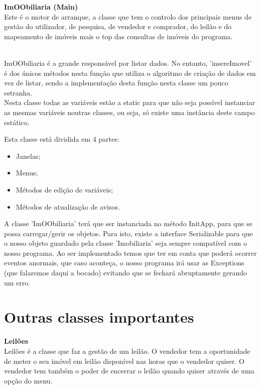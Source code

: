 \documentclass[12pt]{article}
\begin{document}
\pagebreak
\textbf{ImOObiliaria (Main)}
\newline
~\\

Este é o motor de arranque, a classe que tem o controlo dos principais menus de gestão do utilizador, de pesquisa, de vendedor e comprador, do leilão e do mapeamento de imóveis mais o top das consultas de imóveis do programa.

~\\

ImOObiliaria é a grande responsável por listar dados. No entanto, 'insereImovel' é dos únicos métodos nesta função que utiliza o algoritmo de criação de dados em vez de listar, sendo a implementação desta função nesta classe um pouco estranha.
~\\

Nesta classe todas as variáveis estão a static para que não seja possível instanciar as mesmas
variáveis noutras classes, ou seja, só existe uma instância deste campo estático.

Esta classe está dividida em 4 partes:
\newline
\begin{itemize}
\item Janelas;
\item Menus;
\item Métodos de edição de variáveis;
\item Métodos de atualização de avisos.
\end{itemize}

A classe 'ImOObiliaria' terá que ser instanciada no método
InitApp, para que se possa carregar/gerir os objetos.
Para isto, existe a interface Serializable para que o nosso objeto guardado pela classe 'Imobiliaria'
seja sempre compatível com o nosso programa. Ao ser implementado temos que ter em conta
que poderá ocorrer eventos anormais, que caso aconteça, o nosso programa irá usar as Exceptions (que falaremos daqui a bocado)
evitando que se fechará abruptamente gerando um erro. 
~\\

\pagebreak
\section{Outras classes importantes}

\textbf{Leilões}
\newline
~\\

Leilões é a classe que faz a gestão de um leilão. O vendedor tem a oportunidade de meter o seu imóvel em leilão disponível nas horas que o vendedor quiser. O vendedor tem também o poder de encerrar o leilão quando quiser através de uma opção do menu.
~\\
\end{document}
